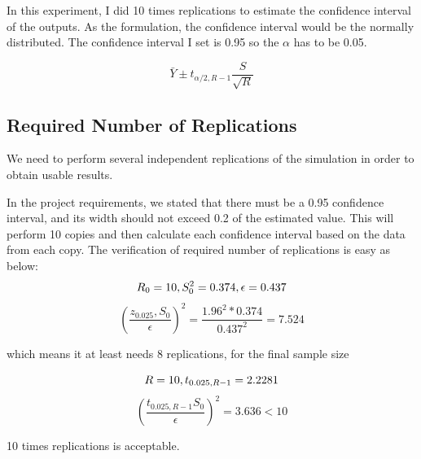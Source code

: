 \documentclass{article}
\begin{document}
In this experiment, I did 10 times replications to estimate the confidence interval of the outputs. As the formulation, the confidence interval would be the normally distributed. The confidence interval I set is 0.95 so the $\alpha$ has to be 0.05.

\begin{equation}
\bar Y\pm t_{\alpha / 2, R-1}\frac{S}{\sqrt R}
\end{equation}


\subsection{Required Number of Replications}
We need to perform several independent replications of the simulation in order to obtain usable results.

In the project requirements, we stated that there must be a 0.95 confidence interval, and its width should not exceed 0.2 of the estimated value. This will perform 10 copies and then calculate each confidence interval based on the data from each copy. The verification of required number of replications is easy as below:
\begin{equation}
R_0 = 10, S_{0}^2 = 0.374, \epsilon = 0.437\\
\end{equation}
\begin{equation}
(\frac{z_0.025, S_0}{\epsilon})^2 = \frac{1.96^2*0.374}{0.437^2} = 7.524
\end{equation}

which means it at least needs 8 replications, for the final sample size

\begin{equation}
R = 10, t_{0.025, R-1} = 2.2281\\
\end{equation}
\begin{equation}
(\frac{ t_{0.025, R-1} S_0}{\epsilon})^2 = 3.636 < 10
\end{equation}

10 times replications is acceptable.
\end{document}
